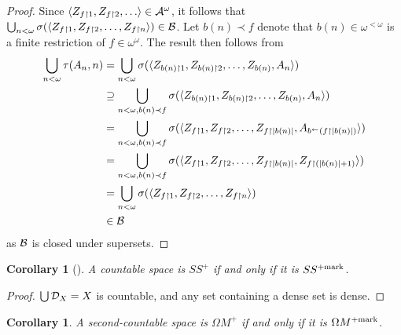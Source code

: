 \documentclass{amsart}
\theoremstyle{plain}
\newtheorem{corollary}[theorem]{Corollary}
\theoremstyle{definition}
\theoremstyle{remark}
\theoremstyle{plain}
\theoremstyle{definition}
\theoremstyle{remark}
\begin{document}
\begin{proof}
  Since \(\<Z_{f\rest1},Z_{f\rest2},\dots\>\in\mc A^\omega\), it follows
  that
  \(
    \bigcup_{n<\omega}\sigma(\langle Z_{f\restriction1},Z_{f\restriction2},\dots,Z_{f\restriction n}\rangle)
      \in
    \mathcal{B}
  \).
  Let \(b(n)\prec f\) denote that \(b(n)\in\omega^{<\omega}\) is a finite
  restriction of \(f\in\omega^\omega\).
  The result then follows from
  \begin{align*}
    \bigcup_{n<\omega}\tau(A_n,n)
      & =
    \bigcup_{n<\omega}
    \sigma(\langle Z_{b(n)\restriction 1},Z_{b(n)\restriction 2},\dots,Z_{b(n)},A_n\rangle)
      \\ & \supseteq
    \bigcup_{n<\omega,b(n)\prec f}
    \sigma(\langle Z_{b(n)\restriction 1},Z_{b(n)\restriction 2},\dots,Z_{b(n)},A_n\rangle)
      \\ & =
    \bigcup_{n<\omega,b(n)\prec f}
    \sigma(\langle Z_{f\restriction 1},Z_{f\restriction 2},\dots,Z_{f\restriction|b(n)|},A_{b^{\leftarrow}(f\restriction|b(n)|)}\rangle)
      \\ & =
    \bigcup_{n<\omega,b(n)\prec f}
    \sigma(\langle Z_{f\restriction 1},Z_{f\restriction 2},\dots,Z_{f\restriction|b(n)|},Z_{f\restriction(|b(n)|+1)}\rangle)
      \\ & =
    \bigcup_{n<\omega}
    \sigma(\langle Z_{f\restriction 1},Z_{f\restriction 2},\dots,Z_{f\restriction n}\rangle)
      \\ & \in
    \mathcal{B}
  \end{align*}
  as \(\mathcal{B}\) is closed under supersets.
\end{proof}

\begin{corollary}[\cite{MR2868880}]
  A countable space is \(SS^+\) if and only if it is
  \(SS^{+\mathrm{mark}}\).
\end{corollary}

\begin{proof}
  \(\bigcup\mathcal{D}_X=X\) is countable, and any set containing a dense
  set is dense.
\end{proof}

\begin{corollary}
  A second-countable space is \(\Omega M^+\) if and only if
  it is \(\Omega M^{+\mathrm{mark}}\).
\end{corollary}
\end{document}
